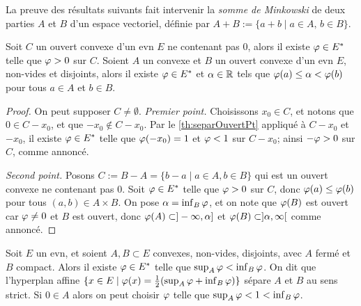 La preuve des résultats suivants fait intervenir la \emph{somme de Minkowski} de deux parties $A$ et $B$ d'un espace vectoriel, définie par $A+B := \{a+b \mid a\in A,\, b\in B\}$. 

\begin{corollary}
\label{corol:separOuvertPt}
%
	Soit $C$ un ouvert convexe d'un evn $E$ ne contenant pas $0$, alors il existe $\varphi \in E^*$ telle que $\varphi>0$ sur $C$.
	Soient $A$ un convexe et $B$ un ouvert convexe d'un evn $E$, non-vides et disjoints, alors il existe $\varphi \in E^*$ et $\alpha \in \mathbb{R}$ tels que $\varphi(a) \leq \alpha < \varphi (b)$ pour tous $a \in A$ et $b \in B$. 
\end{corollary}

\begin{proof} 
	On peut supposer $C \neq \emptyset$.
	\emph{Premier point.} Choisissons $x_0 \in C$, et notons que $0 \in C-x_0$, et que $-x_0 \notin C-x_0$.
	Par le \cref{th:separOuvertPt} appliqué à $C-x_0$ et $-x_0$, il existe $\varphi \in E^*$ telle que $\varphi(-x_0)=1$ et $\varphi<1$ sur $C-x_0$; ainsi $-\varphi>0$ sur $C$, comme annoncé. 
	
	\emph{Second point.} Posons $C:=B-A = \{b-a\mid a \in A, b \in B\}$ qui est un ouvert convexe ne contenant pas $0$. Soit $\varphi\in E^*$ telle que $\varphi>0$ sur $C$, donc $\varphi(a) \leq \varphi(b)$ pour tous $(a,b)\in A \times B$. On pose $\alpha = \inf_B \varphi$, et on note que $\varphi(B)$ est ouvert car $\varphi\neq 0$ et $B$ est ouvert, donc $\varphi(A) \subset ]-\infty,\alpha]$ et $\varphi(B)\subset ]\alpha,\infty[$ comme annoncé.
\end{proof}


\begin{theorem}
\label{th:separFermeComp}
%
	Soit $E$ un evn, et soient $A,B \subset E$ convexes, non-vides, disjoints, avec $A$ fermé et $B$ compact. Alors il existe $\varphi \in E^*$ telle que $\sup_A \varphi < \inf_B \varphi$. 
	On dit que l'hyperplan affine $\{x \in E \mid \varphi(x) = \tfrac 1 2 (\sup_A \varphi + \inf_B \varphi)\}$ sépare $A$ et $B$ au sens strict. Si $0 \in A$ alors on peut choisir $\varphi$ telle que $\sup_A \varphi < 1 < \inf_B \varphi$. 
\end{theorem}

